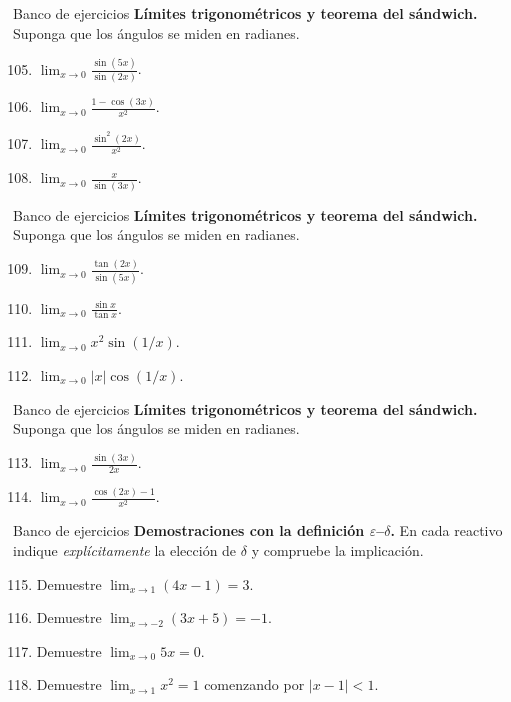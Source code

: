 \documentclass[12pt,aspectratio=169]{beamer}
\begin{document}
\begin{frame}[t,allowframebreaks]{Banco de ejercicios}
\small
\noindent \textbf{Límites trigonométricos y teorema del sándwich.} Suponga que los ángulos se miden en radianes.\par\smallskip
\begin{enumerate}\setcounter{enumi}{104}
\item $\displaystyle\lim_{x\to0}\frac{\sin(5x)}{\sin(2x)}$.
\item $\displaystyle\lim_{x\to0}\frac{1-\cos(3x)}{x^2}$.
\item $\displaystyle\lim_{x\to0}\frac{\sin^2(2x)}{x^2}$.
\item $\displaystyle\lim_{x\to0}\frac{x}{\sin(3x)}$.
\end{enumerate}
\end{frame}


\begin{frame}[t,allowframebreaks]{Banco de ejercicios}
\small
\noindent \textbf{Límites trigonométricos y teorema del sándwich.} Suponga que los ángulos se miden en radianes.\par\smallskip
\begin{enumerate}\setcounter{enumi}{108}
\item $\displaystyle\lim_{x\to0}\frac{\tan(2x)}{\sin(5x)}$.
\item $\displaystyle\lim_{x\to0}\frac{\sin x}{\tan x}$.
\item $\displaystyle\lim_{x\to0}x^2\sin(1/x)$.
\item $\displaystyle\lim_{x\to0}|x|\cos(1/x)$.
\end{enumerate}
\end{frame}


\begin{frame}[t,allowframebreaks]{Banco de ejercicios}
\small
\noindent \textbf{Límites trigonométricos y teorema del sándwich.} Suponga que los ángulos se miden en radianes.\par\smallskip
\begin{enumerate}\setcounter{enumi}{112}
\item $\displaystyle\lim_{x\to0}\frac{\sin(3x)}{2x}$.
\item $\displaystyle\lim_{x\to0}\frac{\cos(2x)-1}{x^2}$.
\end{enumerate}
\end{frame}


\begin{frame}[t,allowframebreaks]{Banco de ejercicios}
\small
\noindent \textbf{Demostraciones con la definición $\varepsilon$--$\delta$.} En cada reactivo indique \emph{explícitamente} la elección de $\delta$ y compruebe la implicación.\par\smallskip
\begin{enumerate}\setcounter{enumi}{114}
\item Demuestre $\lim_{x\to1}(4x-1)=3$.
\item Demuestre $\lim_{x\to-2}(3x+5)=-1$.
\item Demuestre $\lim_{x\to0}5x=0$.
\item Demuestre $\lim_{x\to1}x^2=1$ comenzando por $|x-1|<1$.
\end{enumerate}
\end{frame}
\end{document}

